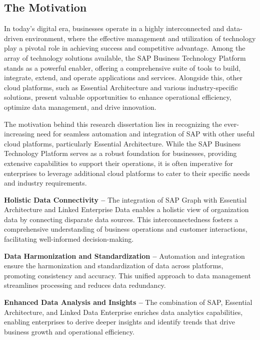 \documentclass{article}
\begin{document}
\maketitle
\subsection{The Motivation}
In today's digital era, businesses operate in a highly interconnected and data-driven environment, where the effective management and utilization of technology play a pivotal role in achieving success and competitive advantage. Among the array of technology solutions available, the SAP Business Technology Platform stands as a powerful enabler, offering a comprehensive suite of tools to build, integrate, extend, and operate applications and services. Alongside this, other cloud platforms, such as Essential Architecture and various industry-specific solutions, present valuable opportunities to enhance operational efficiency, optimize data management, and drive innovation.

The motivation behind this research dissertation lies in recognizing the ever-increasing need for seamless automation and integration of SAP with other useful cloud platforms, particularly Essential Architecture. While the SAP Business Technology Platform serves as a robust foundation for businesses, providing extensive capabilities to support their operations, it is often imperative for enterprises to leverage additional cloud platforms to cater to their specific needs and industry requirements.

\textbf{Holistic Data Connectivity –} The integration of SAP Graph with Essential Architecture and Linked Enterprise Data enables a holistic view of organization data by connecting disparate data sources. This interconnectedness fosters a comprehensive understanding of business operations and customer interactions, facilitating well-informed decision-making.

\textbf{Data Harmonization and Standardization –} Automation and integration ensure the harmonization and standardization of data across platforms, promoting consistency and accuracy. This unified approach to data management streamlines processing and reduces data redundancy.

\textbf{Enhanced Data Analysis and Insights –} The combination of SAP, Essential Architecture, and Linked Data Enterprise enriches data analytics capabilities, enabling enterprises to derive deeper insights and identify trends that drive business growth and operational efficiency.
\end{document}
